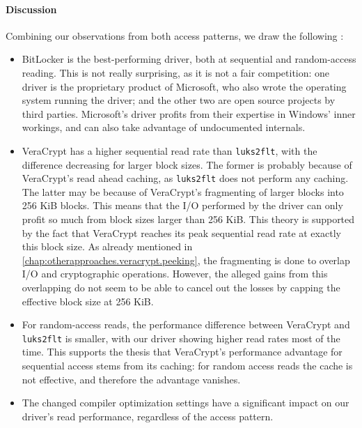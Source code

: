 \paragraph{Discussion}
Combining our observations from both access patterns, we draw the following :
\begin{itemize}[beginpenalty=10000]
	\item BitLocker is the best-performing driver, both at sequential and random-access reading. This is not really surprising, as it is not a fair competition: one driver is the proprietary product of Microsoft, who also wrote the operating system running the driver; and the other two are open source projects by third parties. Microsoft's driver profits from their expertise in Windows' inner workings, and can also take advantage of undocumented internals.
	\item VeraCrypt has a higher sequential read rate than \texttt{luks2flt}, with the difference decreasing for larger block sizes. The former is probably because of VeraCrypt's read ahead caching, as \texttt{luks2flt} does not perform any caching. The latter may be because of VeraCrypt's fragmenting of larger blocks into 256 KiB blocks. This means that the I/O performed by the driver can only profit so much from block sizes larger than 256 KiB. This theory is supported by the fact that VeraCrypt reaches its peak sequential read rate at exactly this block size. As already mentioned in \autoref{chap:otherapproaches.veracrypt.peeking}, the fragmenting is done to overlap I/O and cryptographic operations. However, the alleged gains from this overlapping do not seem to be able to cancel out the losses by capping the effective block size at 256 KiB.
	\item For random-access reads, the performance difference between VeraCrypt and \texttt{luks2flt} is smaller, with our driver showing higher read rates most of the time. This supports the thesis that VeraCrypt's performance advantage for sequential access stems from its caching: for random access reads the cache is not effective, and therefore the advantage vanishes.
	\item The changed compiler optimization settings have a significant impact on our driver's read performance, regardless of the access pattern.
\end{itemize}


